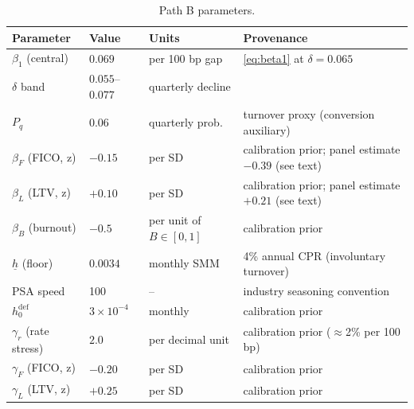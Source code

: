 \documentclass[12pt]{article}
\begin{document}
\begin{table}[H]
\centering
\footnotesize
\setlength{\tabcolsep}{4pt}
\begin{threeparttable}
\caption{Path B parameters.}
\label{tab:params}
\begin{tabular}{@{}llll@{}}
\toprule
Parameter & Value & Units & Provenance \\
\midrule
$\beta_1$ (central) & $0.069$ & per 100 bp gap & \eqref{eq:beta1} at $\delta = 0.065$ \citep{liebersohn2024} \\
$\delta$ band & $0.055$--$0.077$ & quarterly decline & \citet{liebersohn2024} \\
$P_q$ & $0.06$ & quarterly prob. & turnover proxy (conversion auxiliary) \\
$\beta_F$ (FICO, z) & $-0.15$ & per SD & calibration prior; panel estimate $-0.39$ (see text) \\
$\beta_L$ (LTV, z) & $+0.10$ & per SD & calibration prior; panel estimate $+0.21$ (see text) \\
$\beta_B$ (burnout) & $-0.5$ & per unit of $B \in [0,1]$ & calibration prior \\
$\underline{h}$ (floor) & $0.0034$ & monthly SMM & 4\% annual CPR (involuntary turnover) \\
PSA speed & 100 & -- & industry seasoning convention \\
$h^{\mathrm{def}}_0$ & $3\times10^{-4}$ & monthly & calibration prior \\
$\gamma_r$ (rate stress) & $2.0$ & per decimal unit & calibration prior ($\approx$2\% per 100 bp) \\
$\gamma_F$ (FICO, z) & $-0.20$ & per SD & calibration prior \\
$\gamma_L$ (LTV, z) & $+0.25$ & per SD & calibration prior \\
\bottomrule
\end{tabular}
\end{threeparttable}
\end{table}
\end{document}
